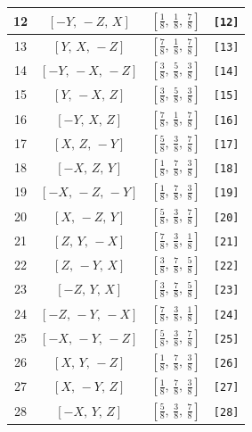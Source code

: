 \documentclass[fleqn,8pt]{jsarticle}
\begin{document}
\begin{longtable}{cccc}
12 & $\left[ - Y,\, - Z,\, X \right]$ & $\left[ \frac{1}{8},\, \frac{1}{8},\, \frac{7}{8} \right]$ & {\tt [12]} \\ \hline
13 & $\left[ Y,\, X,\, - Z \right]$ & $\left[ \frac{7}{8},\, \frac{1}{8},\, \frac{7}{8} \right]$ & {\tt [13]} \\ \hline
14 & $\left[ - Y,\, - X,\, - Z \right]$ & $\left[ \frac{3}{8},\, \frac{5}{8},\, \frac{3}{8} \right]$ & {\tt [14]} \\ \hline
15 & $\left[ Y,\, - X,\, Z \right]$ & $\left[ \frac{3}{8},\, \frac{5}{8},\, \frac{3}{8} \right]$ & {\tt [15]} \\ \hline
16 & $\left[ - Y,\, X,\, Z \right]$ & $\left[ \frac{7}{8},\, \frac{1}{8},\, \frac{7}{8} \right]$ & {\tt [16]} \\ \hline
17 & $\left[ X,\, Z,\, - Y \right]$ & $\left[ \frac{5}{8},\, \frac{3}{8},\, \frac{7}{8} \right]$ & {\tt [17]} \\ \hline
18 & $\left[ - X,\, Z,\, Y \right]$ & $\left[ \frac{1}{8},\, \frac{7}{8},\, \frac{3}{8} \right]$ & {\tt [18]} \\ \hline
19 & $\left[ - X,\, - Z,\, - Y \right]$ & $\left[ \frac{1}{8},\, \frac{7}{8},\, \frac{3}{8} \right]$ & {\tt [19]} \\ \hline
20 & $\left[ X,\, - Z,\, Y \right]$ & $\left[ \frac{5}{8},\, \frac{3}{8},\, \frac{7}{8} \right]$ & {\tt [20]} \\ \hline
21 & $\left[ Z,\, Y,\, - X \right]$ & $\left[ \frac{7}{8},\, \frac{3}{8},\, \frac{1}{8} \right]$ & {\tt [21]} \\ \hline
22 & $\left[ Z,\, - Y,\, X \right]$ & $\left[ \frac{3}{8},\, \frac{7}{8},\, \frac{5}{8} \right]$ & {\tt [22]} \\ \hline
23 & $\left[ - Z,\, Y,\, X \right]$ & $\left[ \frac{3}{8},\, \frac{7}{8},\, \frac{5}{8} \right]$ & {\tt [23]} \\ \hline
24 & $\left[ - Z,\, - Y,\, - X \right]$ & $\left[ \frac{7}{8},\, \frac{3}{8},\, \frac{1}{8} \right]$ & {\tt [24]} \\ \hline
25 & $\left[ - X,\, - Y,\, - Z \right]$ & $\left[ \frac{5}{8},\, \frac{3}{8},\, \frac{7}{8} \right]$ & {\tt [25]} \\ \hline
26 & $\left[ X,\, Y,\, - Z \right]$ & $\left[ \frac{1}{8},\, \frac{7}{8},\, \frac{3}{8} \right]$ & {\tt [26]} \\ \hline
27 & $\left[ X,\, - Y,\, Z \right]$ & $\left[ \frac{1}{8},\, \frac{7}{8},\, \frac{3}{8} \right]$ & {\tt [27]} \\ \hline
28 & $\left[ - X,\, Y,\, Z \right]$ & $\left[ \frac{5}{8},\, \frac{3}{8},\, \frac{7}{8} \right]$ & {\tt [28]} \\ \hline

\end{longtable}
\end{document}
